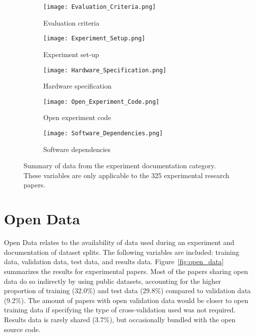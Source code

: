 \begin{figure}[!h]
\begin{center}
    \begin{subfigure}[b]{0.4\textwidth}
        \texttt{[image: Evaluation\_Criteria.png]}
        \caption{Evaluation criteria}
        \label{fig:evaluation_criteria}
    \end{subfigure}
    \begin{subfigure}[b]{0.4\textwidth}
        \texttt{[image: Experiment\_Setup.png]}
        \caption{Experiment set-up}
        \label{fig:experiment_setup}
    \end{subfigure}
    \begin{subfigure}[b]{0.4\textwidth}
        \texttt{[image: Hardware\_Specification.png]}
        \caption{Hardware specification}
        \label{fig:hardware_specification}
    \end{subfigure}
    \begin{subfigure}[b]{0.4\textwidth}
        \texttt{[image: Open\_Experiment\_Code.png]}
        \caption{Open experiment code}
        \label{fig:open_experiment_code}
    \end{subfigure}
    \begin{subfigure}[b]{0.4\textwidth}
        \texttt{[image: Software\_Dependencies.png]}
        \caption{Software dependencies}
        \label{fig:software_dependencies}
    \end{subfigure}
    \caption[Summary of experiment documentation data.]{Summary of data from the experiment documentation category. These variables are only applicable to the 325 experimental research papers.}
    \label{fig:experiment_documentation}
\end{center}
\end{figure}

\section{Open Data}
Open Data relates to the availability of data used during an experiment and documentation of dataset splits. The following variables are included: training data, validation data, test data, and results data. Figure~\ref{fig:open_data} summarizes the results for experimental papers. Most of the papers sharing open data do so indirectly by using public datasets, accounting for the higher proportion of training (32.0\%) and test data (29.8\%) compared to validation data (9.2\%). The amount of papers with open validation data would be closer to open training data if specifying the type of cross-validation used was not required. Results data is rarely shared (3.7\%), but occasionally bundled with the open source code.

